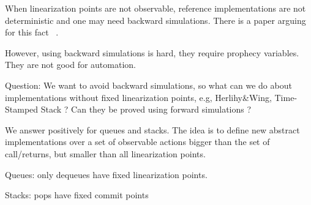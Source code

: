 When linearization points are not observable, reference implementations are not deterministic and one may need backward simulations. There is a paper arguing for this fact ~\cite{DBLP:conf/cav/SchellhornWD12}.

However, using backward simulations is hard, they require prophecy variables. They are not good for automation.

Question: We want to avoid backward simulations, so what can we do about implementations without fixed linearization points, e.g, Herlihy\&Wing, Time-Stamped Stack ? Can they be proved using forward simulations ?

We answer positively for queues and stacks. The idea is to define new abstract implementations over a set of observable actions bigger than the set of call/returns, but smaller than all linearization points.

Queues: only dequeues have fixed linearization points.

Stacks: pops have fixed commit points

\newpage%
